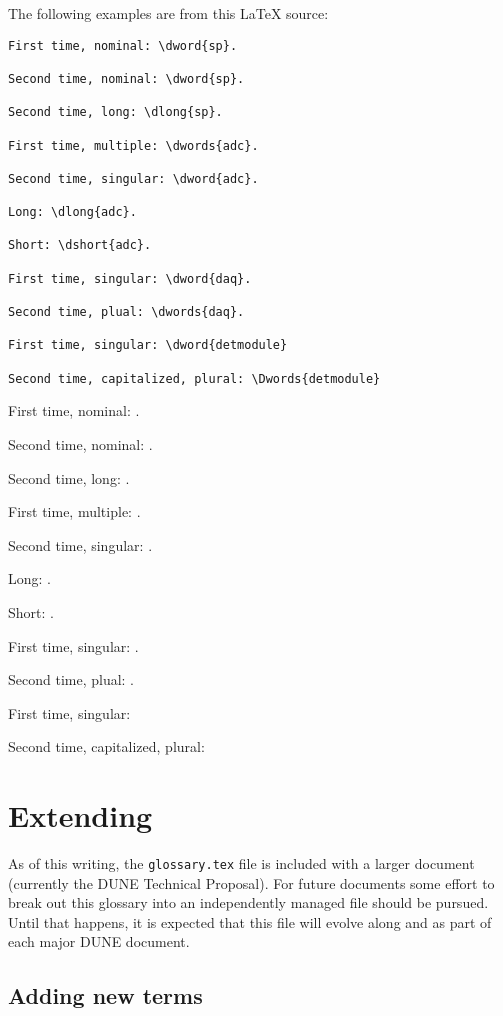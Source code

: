 \documentclass{article}
\begin{document}
The following examples are from this \LaTeX{} source:
\begin{verbatim}
First time, nominal: \dword{sp}.

Second time, nominal: \dword{sp}.

Second time, long: \dlong{sp}.

First time, multiple: \dwords{adc}.

Second time, singular: \dword{adc}.

Long: \dlong{adc}.

Short: \dshort{adc}.

First time, singular: \dword{daq}.

Second time, plual: \dwords{daq}.

First time, singular: \dword{detmodule}

Second time, capitalized, plural: \Dwords{detmodule}
\end{verbatim}

First time, nominal: .

Second time, nominal: .

Second time, long: .

First time, multiple: .

Second time, singular: .

Long: .

Short: .

First time, singular: .

Second time, plual: .

First time, singular: 

Second time, capitalized, plural: 


\section{Extending}

As of this writing, the \texttt{glossary.tex} file is included with a
larger document (currently the DUNE Technical Proposal). 
For future documents some effort to break out this glossary into an
independently managed file should be pursued. 
Until that happens, it is expected that this file will evolve along
and as part of each major DUNE document.

\subsection{Adding new terms}
\end{document}
